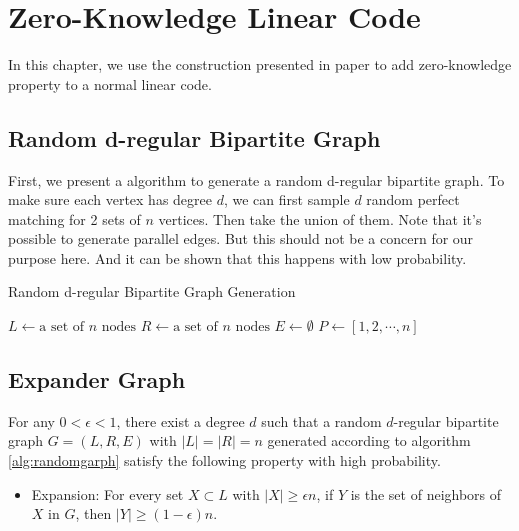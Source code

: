 \chapter{Zero-Knowledge Linear Code}

In this chapter, we use the construction presented in paper \cite{10.1145/2554797.2554815} to add zero-knowledge property to a normal linear code.

\section{Random d-regular Bipartite Graph}
\label{sec:randomgraph}
First, we present a algorithm to generate a random d-regular bipartite graph. To make sure each vertex has degree $d$, we can first sample $d$ random perfect matching for 2 sets of $n$ vertices. Then take the union of them. Note that it's possible to generate parallel edges. But this should not be a concern for our purpose here. And it can be shown that this happens with low probability.

{}
\begin{algorithm}[hbt!]
\caption{Random d-regular Bipartite Graph Generation}
\label{alg:randomgarph}

$L \gets \text{a set of } n \text{ nodes}$\;
$R \gets \text{a set of } n \text{ nodes}$\;
$E \gets \emptyset$\;
$P \gets [1, 2, \cdots , n]$\;
\end{algorithm}


\section{Expander Graph}

\begin{lemma}
\label{lemma:randomgraph}

For any $0 < \epsilon < 1$, there exist a degree $d$ such that a random $d$-regular bipartite graph $G=(L, R, E)$ with $|L| = |R| = n$ generated according to algorithm \ref{alg:randomgarph} satisfy the following property with high probability.

    \begin{itemize}
        \item Expansion: For every set $X \subset L$ with $|X| \ge \epsilon n$, if $Y$ is the set of neighbors of $X$ in $G$, then $|Y| \ge (1 - \epsilon)  n$.
    \end{itemize}

\end{lemma}

